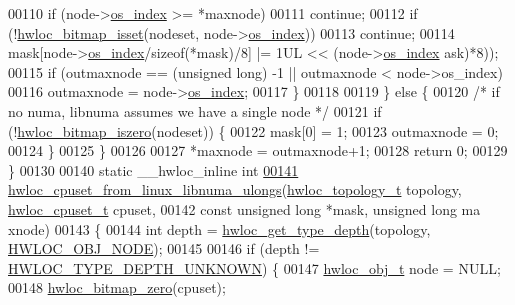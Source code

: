 \begin{DoxyCode}
00110       \textcolor{keywordflow}{if} (node->\hyperlink{a00016_a61a7a80a68eaccbaaa28269e678c81a9}{os_index} >= *maxnode)
00111         \textcolor{keywordflow}{continue};
00112       \textcolor{keywordflow}{if} (!\hyperlink{a00065_ga2583f44cbdb5fff2ea40efdcf3975d3f}{hwloc_bitmap_isset}(nodeset, node->\hyperlink{a00016_a61a7a80a68eaccbaaa28269e678c81a9}{os_index}))
00113         \textcolor{keywordflow}{continue};
00114       mask[node->\hyperlink{a00016_a61a7a80a68eaccbaaa28269e678c81a9}{os_index}/\textcolor{keyword}{sizeof}(*mask)/8] |= 1UL << (node->\hyperlink{a00016_a61a7a80a68eaccbaaa28269e678c81a9}{os_index} %
      ask)*8));
00115       \textcolor{keywordflow}{if} (outmaxnode == (\textcolor{keywordtype}{unsigned} \textcolor{keywordtype}{long}) -1 || outmaxnode < node->os\_index)
00116         outmaxnode = node->\hyperlink{a00016_a61a7a80a68eaccbaaa28269e678c81a9}{os_index};
00117     \}
00118 
00119   \} \textcolor{keywordflow}{else} \{
00120     \textcolor{comment}{/* if no numa, libnuma assumes we have a single node */}
00121     \textcolor{keywordflow}{if} (!\hyperlink{a00065_gaa94fed35d2a598bc4a8657b6955b7bf5}{hwloc_bitmap_iszero}(nodeset)) \{
00122       mask[0] = 1;
00123       outmaxnode = 0;
00124     \}
00125   \}
00126 
00127   *maxnode = outmaxnode+1;
00128   \textcolor{keywordflow}{return} 0;
00129 \}
00130 
00140 \textcolor{keyword}{static} \_\_hwloc\_inline \textcolor{keywordtype}{int}
\hypertarget{a00034_source_l00141}{}\hyperlink{a00068_gafa60816dde33d69149497bcf6c7818e0}{00141} \hyperlink{a00068_gafa60816dde33d69149497bcf6c7818e0}{hwloc_cpuset_from_linux_libnuma_ulongs}(\hyperlink{a00039_ga9d1e76ee15a7dee158b786c30b6a6e38}{hwloc_topology_t} topology, \hyperlink{a00040_ga4bbf39b68b6f568fb92739e7c0ea7801}{hwloc_cpuset_t} 
      cpuset,
00142                                       \textcolor{keyword}{const} \textcolor{keywordtype}{unsigned} \textcolor{keywordtype}{long} *mask, \textcolor{keywordtype}{unsigned} \textcolor{keywordtype}{long} ma
      xnode)
00143 \{
00144   \textcolor{keywordtype}{int} depth = \hyperlink{a00046_gaea7c64dd59467f5201ba87712710b14d}{hwloc_get_type_depth}(topology, \hyperlink{a00041_ggacd37bb612667dc437d66bfb175a8dc55aaf0964881117bdedf1a5e9332cd120dd}{HWLOC_OBJ_NODE});
00145 
00146   \textcolor{keywordflow}{if} (depth != \hyperlink{a00046_ggaf4e663cf42bbe20756b849c6293ef575a0565ab92ab72cb0cec91e23003294aad}{HWLOC_TYPE_DEPTH_UNKNOWN}) \{
00147     \hyperlink{a00016}{hwloc_obj_t} node = NULL;
00148     \hyperlink{a00065_ga6c540b9fe63b8223b6aba46d56dd63b8}{hwloc_bitmap_zero}(cpuset);

\end{DoxyCode}
